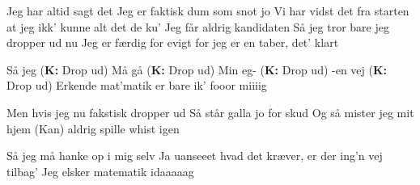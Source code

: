 \documentclass[a4paper,11pt]{article}
\begin{document}
\begin{song}
Jeg har altid sagt det
Jeg er faktisk dum som snot jo
Vi har vidst det fra starten
at jeg ikk’ kunne alt det de ku’
Jeg får aldrig kandidaten
Så jeg tror bare jeg dropper ud nu
Jeg er færdig for evigt for jeg er en
taber, det’ klart

Så jeg (\textbf{K:} Drop ud)
Må gå (\textbf{K:} Drop ud)
Min eg- (\textbf{K:} Drop ud) 
-en vej (\textbf{K:} Drop ud)
Erkende mat’matik er bare ik’ fooor miiiig

Men hvis jeg nu fakstisk dropper ud
Så står galla jo for skud
Og så mister jeg mit hjem
(Kan) aldrig spille whist igen 

Så jeg må hanke op i mig selv
Ja uanseeet hvad det kræver, er der ing’n vej tilbag’
Jeg elsker matematik idaaaaag

\end{song}
\end{document}
